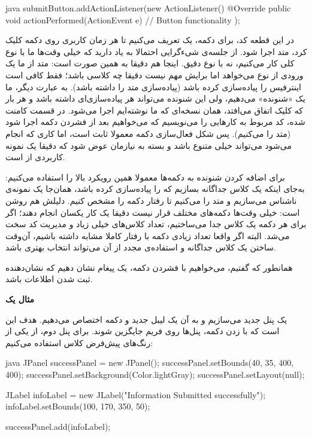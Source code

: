 \begin{codebox}{java}
submitButton.addActionListener(new ActionListener() {
   @Override
   public void actionPerformed(ActionEvent e) {  
      // Button functionality
   }
});
\end{codebox}

در این قطعه کد، برای دکمه، یک  تعریف می‌کنیم
تا هر زمان کاربری روی دکمه کلیک کرد، متد 
اجرا شود. از جلسه‌ی شی‌ءگرایی احتمالا به یاد دارید که خیلی وقت‌ها ما با نوع
کلی کار می‌کنیم، نه با نوع دقیق. اینجا هم دقیقا به همین صورت است: متد
 از ما یک ورودی از نوع
 می‌خواهد اما برایش مهم نیست دقیقا چه کلاسی
باشد؛ فقط کافی است اینترفیس  را پیاده‌سازی
کرده باشد (پیاده‌سازی متد  را داشته باشد).
به عبارت دیگر، ما یک «شنونده» می‌دهیم، ولی این شنونده می‌تواند هر
پیاده‌سازی‌ای داشته باشد و هر بار که کلیک اتفاق می‌افتد، همان نسخه‌ای که ما
نوشته‌ایم اجرا می‌شود. در قسمت کامنت‌ شده، کد مربوط به کارهایی را می‌نویسیم
که می‌خواهیم بعد از فشردن دکمه اجرا شود (متد
 را  می‌کنیم). پس شکل فعال‌سازی
دکمه معمولا ثابت است، اما کاری که انجام می‌شود می‌تواند خیلی متنوع باشد و
بسته به نیازمان عوض شود که دقیقا یک نمونه کاربردی از 
است.

برای اضافه کردن شنونده به دکمه‌ها معمولا همین رویکرد بالا را استفاده
می‌کنیم: به‌جای اینکه یک کلاس جداگانه بسازیم که
 را پیاده‌سازی کرده باشد، همان‌جا
 یک نمونه‌ی ناشناس می‌سازیم و متد
 را  می‌کنیم تا رفتار دکمه را
مشخص کنیم. دلیلش هم روشن است: خیلی وقت‌ها دکمه‌های مختلف قرار نیست دقیقا
یک کار یکسان انجام دهند؛ اگر برای هر دکمه یک کلاس جدا می‌ساختیم، تعداد
کلاس‌های  خیلی زیاد و مدیریت کد سخت می‌شد.
البته اگر واقعا تعداد زیادی دکمه با رفتار کاملا مشابه داشته باشیم، آن‌وقت
ساختن یک کلاس جداگانه و استفاده‌ی مجدد از آن می‌تواند انتخاب بهتری باشد.

همانطور که گفتیم، می‌خواهیم با فشردن دکمه، یک پیغام نشان دهیم که
نشان‌دهنده ثبت شدن اطلاعات باشد.

\textbf{مثال یک}

یک پنل جدید می‌سازیم و به آن یک لیبل جدید و دکمه اختصاص می‌دهیم. هدف این
است که با زدن دکمه، پنل‌ها روی فریم جایگزین شوند. برای پنل دوم، از یکی از
رنگ‌های پیش‌فرض کلاس  استفاده می‌کنیم:

\begin{codebox}{java}
JPanel successPanel = new JPanel();  
successPanel.setBounds(40, 35, 400, 400);   
successPanel.setBackground(Color.lightGray);  
successPanel.setLayout(null);

JLabel infoLabel = new JLabel("Information Submitted successfully");  
infoLabel.setBounds(100, 170, 350, 50);

successPanel.add(infoLabel);
\end{codebox}

